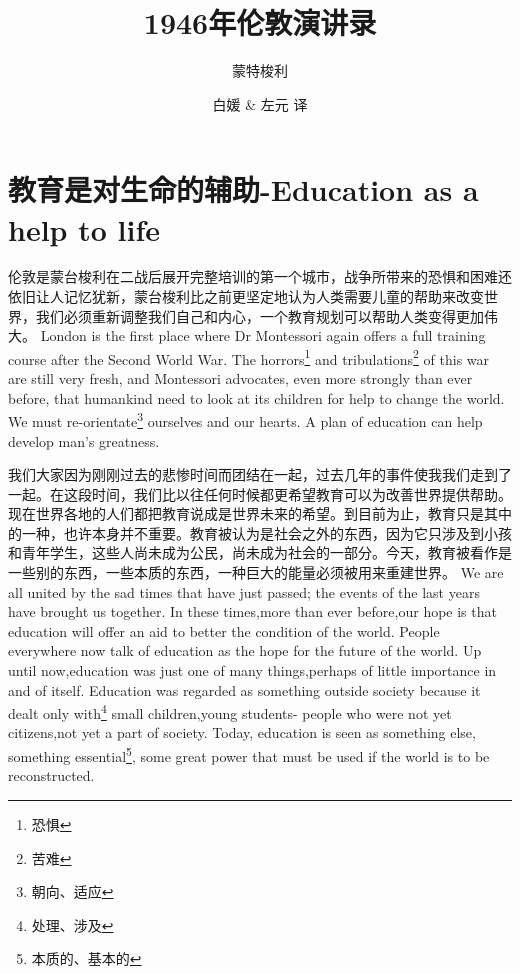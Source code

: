 \documentclass[lang=cn,10pt]{elegantbook}
\title{1946年伦敦演讲录}
\subtitle{蒙特梭利}
\author{白媛 \& 左元 译}
\begin{document}
\maketitle
\frontmatter

\tableofcontents

\mainmatter

\chapter{教育是对生命的辅助-Education as a help to life}

\begin{tcolorbox}[title=摘要,
colback=red!5!white,
colframe=red!75!black,
fonttitle=\bfseries]
伦敦是蒙台梭利在二战后展开完整培训的第一个城市，战争所带来的恐惧和困难还依旧让人记忆犹新，蒙台梭利比之前更坚定地认为人类需要儿童的帮助来改变世界，我们必须重新调整我们自己和内心，一个教育规划可以帮助人类变得更加伟大。
London is the first place where Dr Montessori again offers a full training course after the Second World War. The horrors\footnote{恐惧} and tribulations\footnote{苦难} of this war are still very fresh, and Montessori advocates, even more strongly than ever before, that humankind need to look at its children for help to change the world. We must re-orientate\footnote{朝向、适应} ourselves and our hearts. A plan of education can help develop man's greatness.
\end{tcolorbox}

\begin{tcolorbox}[title=译文,
colback=red!5!white,
colframe=red!75!black,
fonttitle=\bfseries]
我们大家因为刚刚过去的悲惨时间而团结在一起，过去几年的事件使我我们走到了一起。在这段时间，我们比以往任何时候都更希望教育可以为改善世界提供帮助。现在世界各地的人们都把教育说成是世界未来的希望。到目前为止，教育只是其中的一种，也许本身并不重要。教育被认为是社会之外的东西，因为它只涉及到小孩和青年学生，这些人尚未成为公民，尚未成为社会的一部分。今天，教育被看作是一些别的东西，一些本质的东西，一种巨大的能量必须被用来重建世界。
We are all united by the sad times that have just passed; the events of the last years have brought us together. In these times,more than ever before,our hope is that education will offer an aid to better the condition of the world. People everywhere now talk of education as the hope for the future of the world. Up until now,education was just one of many things,perhaps of little importance in and of itself. Education was regarded as something outside society because it dealt only with\footnote{处理、涉及} small children,young students- people who were not yet citizens,not yet a part of society. Today, education is seen as something else, something essential\footnote{本质的、基本的}, some great power that must be used if the world is to be reconstructed.
\end{tcolorbox}
\end{document}
